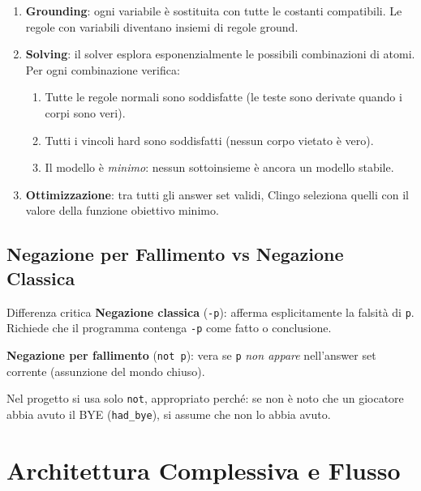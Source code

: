 \documentclass[12pt,a4paper]{article}
\begin{document}
\begin{enumerate}
  \item \textbf{Grounding}: ogni variabile è sostituita con tutte le costanti
        compatibili. Le regole con variabili diventano insiemi di regole ground.
  \item \textbf{Solving}: il solver esplora esponenzialmente le possibili
        combinazioni di atomi. Per ogni combinazione verifica:
        \begin{enumerate}[noitemsep]
          \item Tutte le regole normali sono soddisfatte (le teste sono derivate
                quando i corpi sono veri).
          \item Tutti i vincoli hard sono soddisfatti (nessun corpo vietato è
                vero).
          \item Il modello è \emph{minimo}: nessun sottoinsieme è ancora un
                modello stabile.
        \end{enumerate}
  \item \textbf{Ottimizzazione}: tra tutti gli answer set validi, Clingo
        seleziona quelli con il valore della funzione obiettivo minimo.
\end{enumerate}

\subsection{Negazione per Fallimento vs Negazione Classica}

\begin{warnbox}{Differenza critica}
\textbf{Negazione classica} (\texttt{-p}): afferma esplicitamente la falsità di
\texttt{p}. Richiede che il programma contenga \texttt{-p} come fatto o
conclusione.

\textbf{Negazione per fallimento} (\texttt{not p}): vera se \texttt{p}
\emph{non appare} nell'answer set corrente (assunzione del mondo chiuso).

Nel progetto si usa solo \texttt{not}, appropriato perché: se non è noto che
un giocatore abbia avuto il BYE (\texttt{had\_bye}), si assume che non lo
abbia avuto.
\end{warnbox}

\section{Architettura Complessiva e Flusso}
\end{document}
